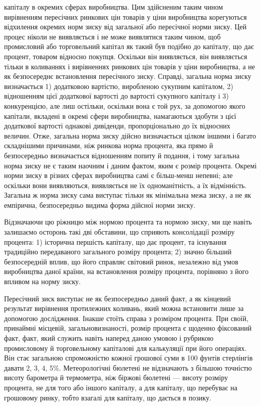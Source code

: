 \parcont{}  %
капіталу в окремих сферах виробництва. Цим здійсненим таким
чином вирівненням пересічних ринкових цін товарів у ціни виробництва
корегуються відхилення окремих норм зиску від загальної
або пересічної норми зиску. Цей процес ніколи не
виявляється і не може виявлятися таким чином, щоб промисловий
або торговельний капітал як такий був подібно до капіталу,
що дає процент, товаром відносно покупця. Оскільки він
виявляється, він виявляється тільки в коливаннях і вирівненнях
ринкових цін товарів у ціни виробництва, а не як безпосереднє
встановлення пересічного зиску. Справді, загальна норма зиску
визначається 1) додатковою вартістю, виробленою сукупним
капіталом, 2) відношенням цієї додаткової вартості до вартості
сукупного капіталу і 3) конкуренцією, але лиш остільки,
оскільки вона є той рух, за допомогою якого капітали, вкладені
в окремі сфери виробництва, намагаються здобути з цієї
додаткової вартості однакові дивіденди, пропорціонально до їх
відносних величин. Отже, загальна норма зиску дійсно визначається
цілком іншими і багато складнішими причинами, ніж ринкова
норма процента, яка прямо й безпосередньо визначається
відношенням попиту й подання, і тому загальна норма зиску
не є таким наочним і даним фактом, яким є розмір процента.
Окремі норми зиску в різних сферах виробництва самі є більш-менш
непевні; але оскільки вони виявляються, виявляється не
їх одноманітність, а їх відмінність. Загальна ж норма зиску сама
виступає тільки як мінімальна межа зиску, а не як емпірична,
безпосередньо видима форма дійсної норми зиску.

Відзначаючи цю ріжницю між нормою процента та нормою
зиску, ми ще навіть залишаємо осторонь такі дві обставини, що
сприяють консолідації розміру процента: 1) історична першість
капіталу, що дає процент, та існування традиційно передаваного
загального розміру процента; 2) значно більший безпосередній
вплив, що його справляє світовий ринок, незалежно від умов
виробництва даної країни, на встановлення розміру процента, порівняно
з його впливом на норму зиску.

Пересічний зиск виступає не як безпосередньо даний факт,
а як кінцевий результат вирівнення протилежних коливань, який
можна встановити лише за допомогою дослідження. Інакше
стоїть справа з розміром процента. При своїй, принаймні місцевій,
загальновизнаності, розмір процента є щоденно фіксований
факт, факт, який служить навіть наперед даною умовою і рубрикою
промисловому й торговельному капіталові для калькуляції
при його операціях. Він стає загальною спроможністю
кожної грошової суми в 100 фунтів стерлінгів давати 2, 3, 4,
5\%. Метеорологічні бюлетені не відзначають з більшою точністю
висоту барометра й термометра, ніж біржові бюлетені —
висоту розміру процента, не для того або іншого капіталу, а для
капіталу, що перебуває на грошовому ринку, тобто взагалі для
капіталу, що дається в позику.
